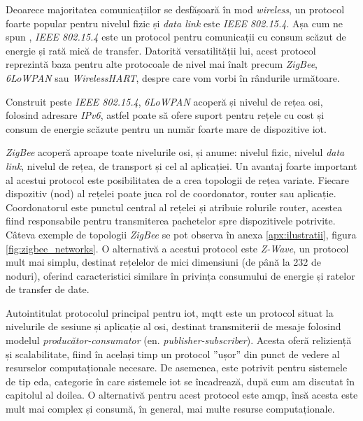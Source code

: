 Deoarece majoritatea comunicațiilor se desfășoară în mod \textit{wireless}, un protocol foarte popular pentru nivelul fizic și \textit{data link} este \textit{IEEE 802.15.4}. Așa cum ne spun \citet{Lin2017}, \textit{IEEE 802.15.4} este un protocol pentru comunicații cu consum scăzut de energie și rată mică de transfer. Datorită versatilității lui, acest protocol reprezintă baza pentru alte protocoale de nivel mai înalt precum \textit{ZigBee}, \textit{6LoWPAN} sau \textit{WirelessHART}, despre care vom vorbi în rândurile următoare.

Construit peste \textit{IEEE 802.15.4}, \textit{6LoWPAN} acoperă și nivelul de rețea \acrshort{osi}, folosind adresare \textit{IPv6}, astfel poate să ofere suport pentru rețele cu cost și consum de energie scăzute pentru un număr foarte mare de dispozitive \acrshort{iot}.

\textit{ZigBee} acoperă aproape toate nivelurile \acrshort{osi}, și anume: nivelul fizic, nivelul \textit{data link}, nivelul de rețea, de transport și cel al aplicației. Un avantaj foarte important al acestui protocol este posibilitatea de a crea topologii de rețea variate. Fiecare dispozitiv (nod) al rețelei poate juca rol de coordonator, router sau aplicație. Coordonatorul este punctul central al rețelei și atribuie rolurile router, acestea fiind responsabile pentru transmiterea pachetelor spre dispozitivele potrivite. Câteva exemple de topologii \textit{ZigBee} se pot observa în anexa \ref{apx:ilustratii}, figura \ref{fig:zigbee_networks}. O alternativă a acestui protocol este \textit{Z-Wave}, un protocol mult mai simplu, destinat rețelelor de mici dimensiuni (de până la 232 de noduri), oferind caracteristici similare în privința consumului de energie și ratelor de transfer de date.

Autointitulat protocolul principal pentru \acrshort{iot}, \acrfull{mqtt} este un protocol situat la nivelurile de sesiune și aplicație al \acrshort{osi}, destinat transmiterii de mesaje folosind modelul \textit{producător-consumator} (en. \textit{publisher-subscriber}). Acesta oferă reliziență și scalabilitate, fiind în același timp un protocol ”ușor” din punct de vedere al resurselor computaționale necesare. De asemenea, este potrivit pentru sistemele de tip \acrshort{eda}, categorie în care sistemele \acrshort{iot} se încadrează, după cum am discutat în capitolul al doilea. O alternativă pentru acest protocol este \acrfull{amqp}, însă acesta este mult mai complex și consumă, în general, mai multe resurse computaționale.

